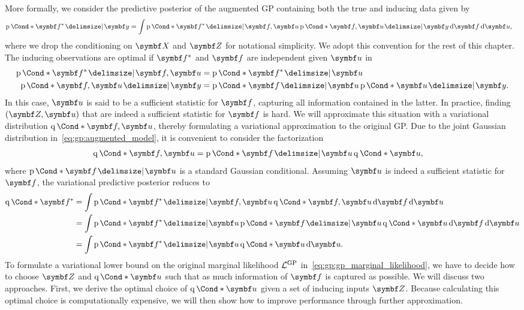 More formally, we consider the predictive posterior of the augmented GP containing both the true and inducing data given by
\begin{align}
    \Prob*{\mat{f^\ast} \given \mat{y}}
     & = \int \Prob*{\mat{f^\ast} \given \mat{f}, \mat{u}} \Prob*{\mat{f}, \mat{u} \given \mat{y}} \diff \mat{f} \diff \mat{u},
\end{align}
where we drop the conditioning on $\mat{X}$ and $\mat{Z}$ for notational simplicity.
We adopt this convention for the rest of this chapter.
The inducing observations are optimal if $\mat{f^\ast}$ and $\mat{f}$ are independent given $\mat{u}$ in
\begin{align}
    \begin{split}
        \Prob*{\mat{f^\ast} \given \mat{f}, \mat{u}}
        & = \Prob*{\mat{f^\ast} \given \mat{u}}                           \\
        \Prob*{\mat{f}, \mat{u} \given \mat{y}}
        & = \Prob*{\mat{f} \given \mat{u}} \Prob*{\mat{u} \given \mat{y}}.
    \end{split}
\end{align}
In this case, $\mat{u}$ is said to be a sufficient statistic for $\mat{f}$, capturing all information contained in the latter.
In practice, finding $(\mat{Z}, \mat{u})$ that are indeed a sufficient statistic for $\mat{f}$ is hard.
We will approximate this situation with a variational distribution $\Variat*{\mat{f}, \mat{u}}$, thereby formulating a variational approximation to the original GP.
Due to the joint Gaussian distribution in~\cref{eq:gp:augmented_model}, it is convenient to consider the factorization
\begin{align}
    \Variat*{\mat{f}, \mat{u}}
     & = \Prob*{\mat{f} \given \mat{u}} \Variat*{\mat{u}},
\end{align}
where $\Prob*{\mat{f} \given \mat{u}}$ is a standard Gaussian conditional.
Assuming $\mat{u}$ is indeed a sufficient statistic for $\mat{f}$, the variational predictive posterior reduces to
\begin{align}
    \begin{split}
        \label{eq:gp:sgpr_predictive_posterior}
        \Variat*{\mat{f^\ast}}
        & = \int \Prob*{\mat{f^\ast} \given \mat{f}, \mat{u}} \Variat*{\mat{f}, \mat{u}} \diff \mat{f} \diff \mat{u}              \\
        & = \int \Prob*{\mat{f^\ast} \given \mat{u}} \Prob*{\mat{f} \given \mat{u}} \Variat*{\mat{u}} \diff \mat{f} \diff \mat{u} \\
        & = \int \Prob*{\mat{f^\ast} \given \mat{u}} \Variat*{\mat{u}} \diff \mat{u}.
    \end{split}
\end{align}
To formulate a variational lower bound on the original marginal likelihood $\mathcal{L}^{\text{GP}}$ in~\cref{eq:gp:gp_marginal_likelihood}, we have to decide how to choose $\mat{Z}$ and $\Variat*{\mat{u}}$ such that as much information of $\mat{f}$ is captured as possible.
We will discuss two approaches.
First, we derive the optimal choice of $\Variat*{\mat{u}}$ given a set of inducing inputs $\mat{Z}$.
Because calculating this optimal choice is computationally expensive, we will then show how to improve performance through further approximation.

